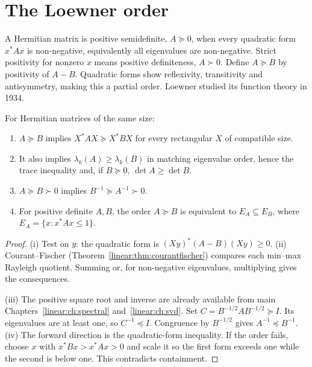 \section{The Loewner order}

A Hermitian matrix is positive semidefinite, $A\succeq0$, when every quadratic form $x^*Ax$ is non-negative, equivalently all eigenvalues are non-negative. Strict positivity for nonzero $x$ means positive definiteness, $A\succ0$. Define $A\succeq B$ by positivity of $A-B$. Quadratic forms show reflexivity, transitivity and antisymmetry, making this a partial order. Loewner studied its function theory in 1934.

\begin{proposition}\label{linear:prop:loewner}
For Hermitian matrices of the same size:
\begin{enumerate}[label=(\roman*)]
\item $A\succeq B$ implies $X^*AX\succeq X^*BX$ for every rectangular $X$ of compatible size.
\item It also implies $\lambda_k(A)\ge\lambda_k(B)$ in matching eigenvalue order, hence the trace inequality and, if $B\succeq0$, $\det A\ge\det B$.
\item $A\succeq B\succ0$ implies $B^{-1}\succeq A^{-1}\succ0$.
\item For positive definite $A,B$, the order $A\succeq B$ is equivalent to $E_A\subseteq E_B$, where $E_A=\{x:x^*Ax\le1\}$.
\end{enumerate}
\end{proposition}
\begin{proof}
(i) Test on $y$: the quadratic form is $(Xy)^*(A-B)(Xy)\ge0$. (ii) Courant--Fischer (Theorem~\ref{linear:thm:courantfischer}) compares each min--max Rayleigh quotient. Summing or, for non-negative eigenvalues, multiplying gives the consequences.

(iii) The positive square root and inverse are already available from main Chapters~\ref{linear:ch:spectral} and~\ref{linear:ch:svd}. Set $C=B^{-1/2}AB^{-1/2}\succeq I$. Its eigenvalues are at least one, so $C^{-1}\preceq I$. Congruence by $B^{-1/2}$ gives $A^{-1}\preceq B^{-1}$. (iv) The forward direction is the quadratic-form inequality. If the order fails, choose $x$ with $x^*Bx>x^*Ax>0$ and scale it so the first form exceeds one while the second is below one. This contradicts containment.
\end{proof}

